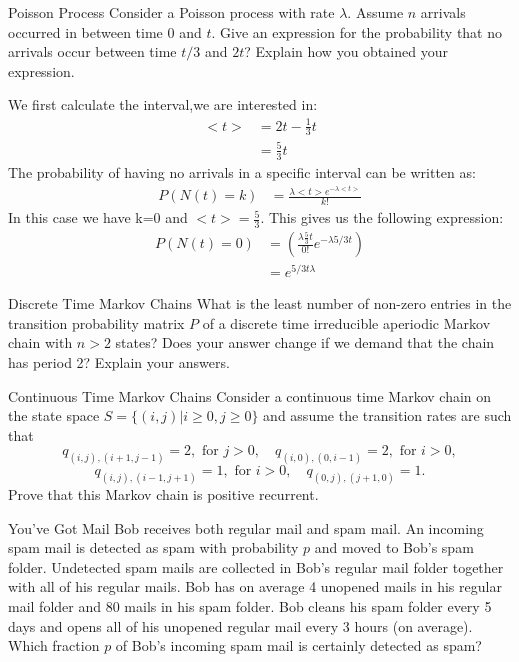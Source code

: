 \begin{problem}{Poisson Process}
Consider a Poisson process with rate $ \lambda$. Assume $n$ arrivals occurred in between time $0$ and $t$. Give an expression for the probability that no arrivals occur between time $t/3$ and $2t$? Explain how you obtained your expression.
\end{problem}

\begin{solution}
We first calculate the interval,we are interested in:
\begin{align*}
    <t>&=2t-\frac{1}{3}t\\
    &= \frac{5}{3}t
\end{align*}
The probability of having no arrivals in a specific interval can be written as:
\begin{align*}
    P(N(t)=k)&= \frac{\lambda <t> e^{-\lambda <t>}}{k!}
\end{align*}
In this case we have k=0 and $<t>=\frac{5}{3}$. This gives us the following expression:
\begin{align*}
   P(N(t)=0) &= \left (\frac{\lambda \frac{5}{3}t}{0!}e^{-\lambda 5/3 t}\right )\\
   &= e^{5/3 t \lambda }
\end{align*}
\end{solution}

\begin{problem}{Discrete Time Markov Chains}
What is the least number of non-zero entries in the transition probability matrix $P$ of a discrete time irreducible aperiodic Markov chain with $n > 2$ states? Does your answer change if we demand that the chain has period 2? Explain your answers.
\end{problem}

\begin{problem}{Continuous Time Markov Chains}
Consider a continuous time Markov chain on the state space $S = \{(i, j)|i \geq 0, j \geq 0\}$ and assume the transition rates are such that
\[
q_{(i,j),(i+1,j-1)} = 2, \text{ for } j > 0, \quad
q_{(i,0),(0,i-1)} = 2, \text{ for } i > 0,
\]
\[
q_{(i,j),(i-1,j+1)} = 1, \text{ for } i > 0, \quad
q_{(0,j),(j+1,0)} = 1.
\]
Prove that this Markov chain is positive recurrent.
\end{problem}

\begin{problem}{You've Got Mail}
Bob receives both regular mail and spam mail. An incoming
spam mail is detected as spam with probability $p$ and moved to Bob’s spam folder.
Undetected spam mails are collected in Bob’s regular mail folder together with all of his
regular mails. Bob has on average 4 unopened mails in his regular mail folder and 80
mails in his spam folder. Bob cleans his spam folder every 5 days and opens all of his
unopened regular mail every 3 hours (on average). Which fraction $p$ of Bob’s incoming
spam mail is certainly detected as spam?
\end{problem}

